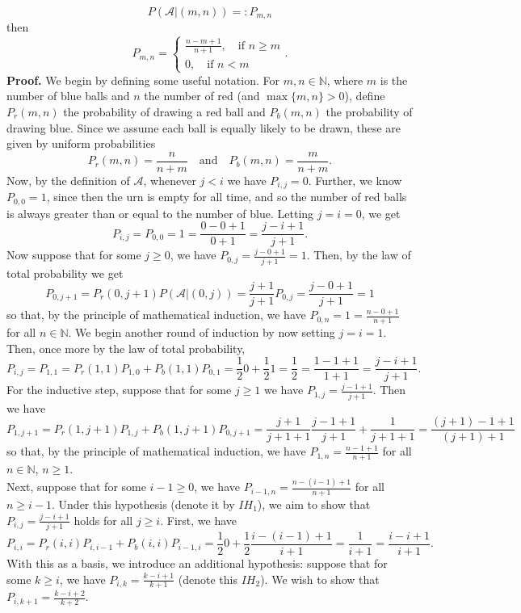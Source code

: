 \documentclass[11pt, letterpaper]{article}
\newcommand{\mbb}[1]{\mathbb{#1}}
\newcommand{\mc}[1]{\mathcal{#1}}
\begin{document}
    \[P(\mc{A}|(m,n))=:P_{m,n}\]
    then
    \[P_{m,n}=\begin{cases}
        \frac{n-m+1}{n+1},\quad\text{if $n\geq m$}\\
        0,\quad\text{if $n<m$}
    \end{cases}.\]
    {\bf Proof.} We begin by defining some useful notation. For $m,n\in\mbb{N}$, where $m$ is the number of blue balls and $n$ the number of red (and $\max\{m,n\}>0$), define $P_r(m,n)$ the probability of drawing a red ball and 
    $P_b(m,n)$ the probability of drawing blue. Since we assume each ball is equally likely to be drawn, these are given by uniform probabilities
    \[P_r(m,n)=\frac{n}{n+m}\quad\text{and}\quad P_b(m,n)=\frac{m}{n+m}.\]
    Now, by the definition of $\mc{A}$, whenever $j<i$ we have $P_{i,j}=0$. Further, we know $P_{0,0}=1$, since then the urn is empty for all time, and so the number of red balls is always greater than or equal to the number of blue. Letting $j=i=0$, we get
    \[P_{i,j}=P_{0,0}=1=\frac{0-0+1}{0+1}=\frac{j-i+1}{j+1}.\]
    Now suppose that for some $j\geq 0$, we have $P_{0,j}=\frac{j-0+1}{j+1}=1$.  Then, by the law of total probability we get
    \[P_{0,j+1}=P_r(0,j+1)P(\mc{A}|(0,j))=\frac{j+1}{j+1}P_{0,j}=\frac{j-0+1}{j+1}=1\]
    so that, by the principle of mathematical induction, we have $P_{0,n}=1=\frac{n-0+1}{n+1}$ for all $n\in\mbb{N}$. We begin another round of induction by now setting $j=i=1$. Then, once more by the law of total probability,
    \[P_{i,j}=P_{1,1}=P_r(1,1)P_{1,0}+P_b(1,1)P_{0,1}=\frac{1}{2}0+\frac{1}{2}1=\frac{1}{2}=\frac{1-1+1}{1+1}=\frac{j-i+1}{j+1}.\]
    For the inductive step, suppose that for some $j\geq 1$ we have $P_{1,j}=\frac{j-1+1}{j+1}$. Then we have
    \[P_{1,j+1}=P_r(1,j+1)P_{1,j}+P_b(1,j+1)P_{0,j+1}=\frac{j+1}{j+1+1}\frac{j-1+1}{j+1}+\frac{1}{j+1+1}=\frac{(j+1)-1+1}{(j+1)+1}\]
    so that, by the principle of mathematical induction, we have $P_{1,n}=\frac{n-1+1}{n+1}$ for all $n\in\mbb{N}$, $n\geq 1$. \\[10pt]
    Next, suppose that for some $i-1\geq 0$, we have $P_{i-1,n}=\frac{n-(i-1)+1}{n+1}$ for all $n\geq i-1$. Under this hypothesis (denote it by $IH_1$), we aim to show that $P_{i,j}=\frac{j-i+1}{j+1}$ holds for all $j\geq i$. First, we have
    \[P_{i,i}=P_r(i,i)P_{i,i-1}+P_b(i,i)P_{i-1,i}=\frac{1}{2}0+\frac{1}{2}\frac{i-(i-1)+1}{i+1}=\frac{1}{i+1}=\frac{i-i+1}{i+1}.\]
    With this as a basis, we introduce an additional hypothesis: suppose that for some $k\geq i$, we have $P_{i,k}=\frac{k-i+1}{k+1}$ (denote this $IH_2$). We wish to show that $P_{i,k+1}=\frac{k-i+2}{k+2}$. 
\end{document}
